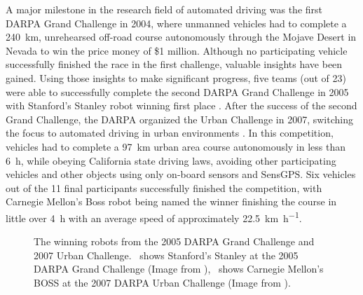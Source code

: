A major milestone in the research field of automated driving was the first \ac{DARPA} Grand Challenge in 2004, where unmanned vehicles had to complete a \SI{240}{\kilo\meter}, unrehearsed off-road course autonomously through the Mojave Desert in Nevada to win the price money of \$1 million.
Although no participating vehicle successfully finished the race \cite{Bacha2004} in the first challenge, valuable insights have been gained.
Using those insights to make significant progress, five teams (out of 23) were able to successfully complete the second \ac{DARPA} Grand Challenge in 2005 with Stanford's Stanley robot winning first place \cite{Thrun2006}.
After the success of the second Grand Challenge, the \ac{DARPA} organized the Urban Challenge in 2007, switching the focus to automated driving in urban environments \cite{Buehler2009}.
In this competition, vehicles had to complete a \SI{97}{\kilo\meter} urban area course autonomously in less than \SI{6}{\hour}, while obeying California state driving laws, avoiding other participating vehicles and other objects using only on-board sensors and \ac{SensGPS}.
Six vehicles out of the 11 final participants successfully finished the competition, with Carnegie Mellon's Boss robot \cite{Urmson.2008} being named the winner finishing the course in little over \SI{4}{\hour} with an average speed of approximately \SI[per-mode=symbol]{22.5}{\kilo\meter\per\hour}.

\begin{figure}[t!]
	\centering
	\caption{The winning robots from the 2005 \ac{DARPA} Grand Challenge and 2007 Urban Challenge.~\protect{} shows Stanford's Stanley at the 2005 \ac{DARPA} Grand Challenge (Image from \cite{Thrun2006}),~\protect{} shows Carnegie Mellon's BOSS at the 2007 \ac{DARPA} Urban Challenge (Image from \cite{Urmson.2008}).}\label{fig:darpa_chal}
\end{figure}

